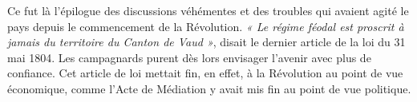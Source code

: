 \documentclass[french,twoside]{book} %
\newif\ifdev
\renewcommand{\LettrineFontHook}{\color{rubric}}
\newcommand{\initialiv}[2]{%
  \let\oldLFH\LettrineFontHook
  \IfSubStr{Q}{#1}{
    \lettrine[lines=4, lhang=0.2, loversize=-0.1, lraise=0.2]{\smash{#1}}{#2}
  }{\IfSubStr{É}{#1}{
    \lettrine[lines=4, lhang=0.2, loversize=-0, lraise=0]{\smash{#1}}{#2}
  }{\IfSubStr{ÀÂ}{#1}{
    \lettrine[lines=4, lhang=0.2, loversize=-0, lraise=0, slope=0.6em]{\smash{#1}}{#2}
  }{\IfSubStr{A}{#1}{
    \lettrine[lines=4, lhang=0.2, loversize=0.2, slope=0.6em]{\smash{#1}}{#2}
  }{\IfSubStr{V}{#1}{
    \lettrine[lines=4, lhang=0.2, loversize=0.2, slope=-0.5em]{\smash{#1}}{#2}
  }{
    \lettrine[lines=4, lhang=0.2, loversize=0.2]{\smash{#1}}{#2}
  }}}}}
  \let\LettrineFontHook\oldLFH
}
\newcommand\chapterclose{} %
\renewcommand{\LettrineFontHook}{\bfseries\color{rubric}}
\begin{document}
Ce fut là l’épilogue des discussions véhémentes et des troubles qui avaient agité le pays depuis le commencement de la Révolution. \emph{« Le régime féodal est proscrit à jamais du territoire du Canton de Vaud »}, disait le dernier article de la loi du 31 mai 1804. Les campagnards purent dès lors envisager l’avenir avec plus de confiance. Cet article de loi mettait fin, en effet, à la Révolution au point de vue économique, comme l’Acte de Médiation y avait mis fin au point de vue politique.
\chapterclose

 


\ifdev %
\fontname\font — \textsc{Les règles du jeu}\par
(\hyperref[utopie]{\underline{Lien}})\par
\noindent \initialiv{A}{lors là}\blindtext\par
\noindent \initialiv{À}{ la bonheur des dames}\blindtext\par
\noindent \initialiv{É}{tonnez-le}\blindtext\par
\noindent \initialiv{Q}{ualitativement}\blindtext\par
\noindent \initialiv{V}{aloriser}\blindtext\par
\Blindtext
\phantomsection
\label{utopie}
\Blinddocument
\fi
\end{document}
